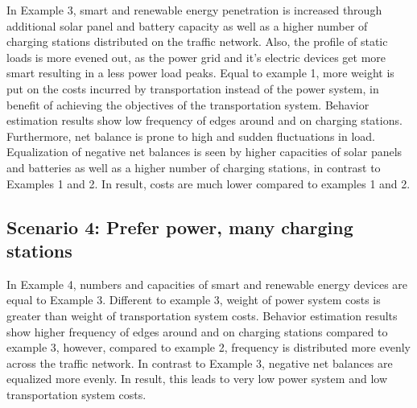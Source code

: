 In Example 3, smart and renewable energy penetration is increased through additional solar panel and battery capacity as well as a higher number of charging stations distributed on the traffic network. Also, the profile of static loads is more evened out, as the power grid and it's electric devices get more smart resulting in a less power load peaks. 
Equal to example 1, more weight is put on the costs incurred by transportation instead of the power system, in benefit of achieving the objectives of the transportation system. Behavior estimation results show low frequency of edges around and on charging stations. Furthermore, net balance is prone to high and sudden fluctuations in load. Equalization of negative net balances is seen by higher capacities of solar panels and batteries as well as a higher number of charging stations, in contrast to Examples 1 and 2. In result, costs are much lower compared to examples 1 and 2.

\subsection*{Scenario 4: Prefer power, many charging stations}

In Example 4, numbers and capacities of smart and renewable energy devices are equal to Example 3. Different to example 3, weight of power system costs is greater than weight of transportation system costs. Behavior estimation results show higher frequency of edges around and on charging stations compared to example 3, however, compared to example 2, frequency is distributed more evenly across the traffic network. In contrast to Example 3, negative net balances are equalized more evenly. In result, this leads to very low power system and low transportation system costs.